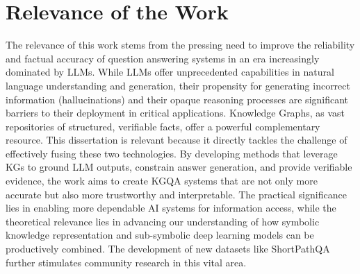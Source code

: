 \section*{Relevance of the Work}
\label{sec:synopsis:relevance}
The relevance of this work stems from the pressing need to improve the reliability and factual accuracy of question answering systems in an era increasingly dominated by LLMs. While LLMs offer unprecedented capabilities in natural language understanding and generation, their propensity for generating incorrect information (hallucinations) and their opaque reasoning processes are significant barriers to their deployment in critical applications. Knowledge Graphs, as vast repositories of structured, verifiable facts, offer a powerful complementary resource. This dissertation is relevant because it directly tackles the challenge of effectively fusing these two technologies. By developing methods that leverage KGs to ground LLM outputs, constrain answer generation, and provide verifiable evidence, the work aims to create KGQA systems that are not only more accurate but also more trustworthy and interpretable. The practical significance lies in enabling more dependable AI systems for information access, while the theoretical relevance lies in advancing our understanding of how symbolic knowledge representation and sub-symbolic deep learning models can be productively combined. The development of new datasets like ShortPathQA~\cite{DBLP:conf/nldb/SalnikovSPQA25} further stimulates community research in this vital area.

